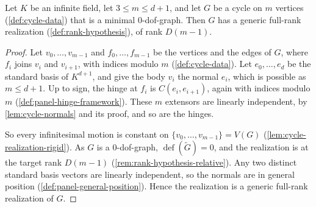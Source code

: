 \begin{lemma}
  \label{lem:cycle-realization}
  \leanok
  Let $K$ be an infinite field, let $3 \le m \le d + 1$, and let $G$ be a
  cycle on $m$ vertices (\cref{def:cycle-data}) that is a minimal
  $0$-dof-graph. Then $G$ has a generic full-rank realization
  (\cref{def:rank-hypothesis}), of rank $D(m - 1)$.
\end{lemma}
\begin{proof}
  \leanok
  Let
  $v_0, \dots, v_{m-1}$ and $f_0, \dots, f_{m-1}$ be the vertices and the
  edges of $G$, where $f_i$ joins $v_i$ and $v_{i+1}$, with indices
  modulo $m$ (\cref{def:cycle-data}). Let $e_0, \dots, e_d$ be the
  standard basis of $K^{d+1}$, and give the body $v_i$ the normal $e_i$,
  which is possible as $m \le d + 1$. Up to sign, the hinge at $f_i$ is
  $C(e_i, e_{i+1})$, again with indices modulo $m$
  (\cref{def:panel-hinge-framework}). These $m$ extensors are linearly
  independent, by \cref{lem:cycle-normals} and its proof, and so are the
  hinges.

  So every infinitesimal motion is constant on
  $\{v_0, \dots, v_{m-1}\} = V(G)$ (\cref{lem:cycle-realization-rigid}).
  As $G$ is a $0$-dof-graph, $\operatorname{def}(\tilde G) = 0$, and the
  realization is at the target rank $D(m - 1)$
  (\cref{rem:rank-hypothesis-relative}). Any two distinct
  standard basis vectors are linearly independent, so the normals are in
  general position (\cref{def:panel-general-position}). Hence the
  realization is a generic full-rank realization of $G$.
\end{proof}

